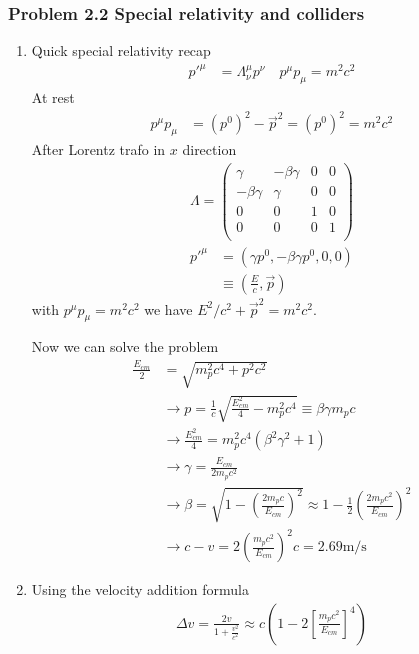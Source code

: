 \documentclass[10pt,a4paper]{book}
\theoremstyle{definition}
\begin{document}
\subsubsection{Problem 2.2 Special relativity and colliders}
\begin{enumerate}
    \item Quick special relativity recap
    \begin{align}
        p'^\mu&=\Lambda^\mu_\nu p^\nu\quad p^\mu p_\mu=m^2c^2
    \end{align}
    At rest
    \begin{align}
        p^\mu p_\mu&=(p^0)^2-\vec{p}^2=(p^0)^2=m^2c^2
    \end{align}
    After Lorentz trafo in $x$ direction
    \begin{align}
        \Lambda=\begin{pmatrix}
        \gamma & -\beta\gamma & 0 & 0\\
        -\beta\gamma & \gamma & 0 & 0\\
        0 & 0 & 1 & 0\\
        0 & 0 & 0 & 1\\
        \end{pmatrix}
    \end{align}
    \begin{align}
        p'^\mu&=(\gamma p^0,-\beta\gamma p^0,0,0)\\
        &\equiv\left(\frac{E}{c},\vec{p}\right)
    \end{align}
    with $p^\mu p_\mu=m^2c^2$ we have $E^2/c^2+\vec{p}^2=m^2c^2$.
    
    Now we can solve the problem
    \begin{align}
        \frac{E_{cm}}{2}&=\sqrt{m_p^2c^4+p^2c^2}\\
        &\rightarrow p = \frac{1}{c}\sqrt{\frac{E_{cm}^2}{4}-m_p^2c^4}\equiv\beta\gamma m_pc\\
        &\rightarrow \frac{E_{cm}^2}{4}=m_p^2c^4(\beta^2\gamma^2+1)\\
        &\rightarrow \gamma=\frac{E_{cm}}{2m_pc^2}\\
        &\rightarrow\beta=\sqrt{1-\left(\frac{2m_pc}{E_{cm}}\right)^2}\approx1-\frac{1}{2}\left(\frac{2m_pc^2}{E_{cm}}\right)^2\\
        &\rightarrow c-v=2\left(\frac{m_pc^2}{E_{cm}}\right)^2c=2.69\text{m/s}
    \end{align}
    \item Using the velocity addition formula
    \begin{align}
        \Delta v=\frac{2v}{1+\frac{v^2}{c^2}}\approx c\left(1-2\left[\frac{m_pc^2}{E_{cm}}\right]^4\right)
    \end{align}
\end{enumerate}
\end{document}
